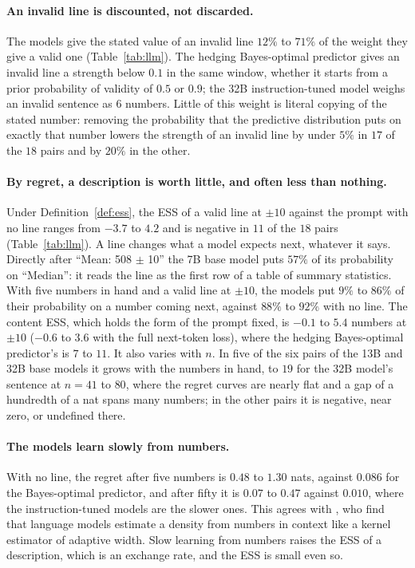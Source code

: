 \documentclass[10pt]{article}
\begin{document}
\paragraph{An invalid line is discounted, not discarded.} The models give the stated value of an invalid line $12\%$ to $71\%$ of the weight they give a valid one (Table~\ref{tab:llm}). The hedging Bayes-optimal predictor gives an invalid line a strength below $0.1$ in the same window, whether it starts from a prior probability of validity of $0.5$ or $0.9$; the 32B instruction-tuned model weighs an invalid sentence as $6$ numbers. Little of this weight is literal copying of the stated number: removing the probability that the predictive distribution puts on exactly that number lowers the strength of an invalid line by under $5\%$ in $17$ of the $18$ pairs and by $20\%$ in the other.

\paragraph{By regret, a description is worth little, and often less than nothing.} Under Definition~\ref{def:ess}, the ESS of a valid line at $\pm 10$ against the prompt with no line ranges from $-3.7$ to $4.2$ and is negative in $11$ of the $18$ pairs (Table~\ref{tab:llm}). A line changes what a model expects next, whatever it says. Directly after ``Mean: 508 $\pm$ 10'' the 7B base model puts $57\%$ of its probability on ``Median'': it reads the line as the first row of a table of summary statistics. With five numbers in hand and a valid line at $\pm 10$, the models put $9\%$ to $86\%$ of their probability on a number coming next, against $88\%$ to $92\%$ with no line. The content ESS, which holds the form of the prompt fixed, is $-0.1$ to $5.4$ numbers at $\pm 10$ ($-0.6$ to $3.6$ with the full next-token loss), where the hedging Bayes-optimal predictor's is $7$ to $11$. It also varies with $n$. In five of the six pairs of the 13B and 32B base models it grows with the numbers in hand, to $19$ for the 32B model's sentence at $n = 41$ to $80$, where the regret curves are nearly flat and a gap of a hundredth of a nat spans many numbers; in the other pairs it is negative, near zero, or undefined there.

\paragraph{The models learn slowly from numbers.} With no line, the regret after five numbers is $0.48$ to $1.30$ nats, against $0.086$ for the Bayes-optimal predictor, and after fifty it is $0.07$ to $0.47$ against $0.010$, where the instruction-tuned models are the slower ones. This agrees with \citet{liu2025}, who find that language models estimate a density from numbers in context like a kernel estimator of adaptive width. Slow learning from numbers raises the ESS of a description, which is an exchange rate, and the ESS is small even so.
\end{document}
